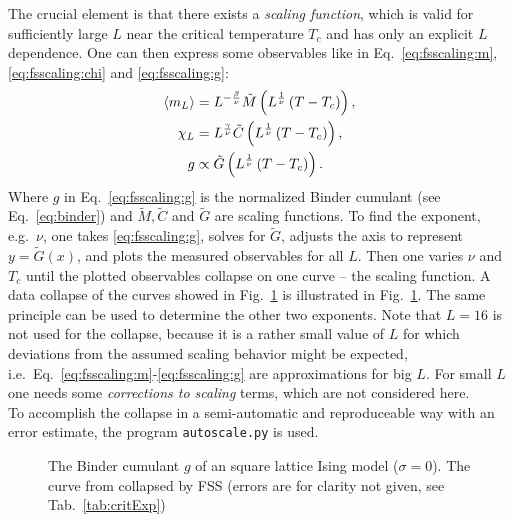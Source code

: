     The crucial element is that there exists a \emph{scaling function},
    which is valid for sufficiently large \(L\) near the critical
    temperature \(T_{c}\) and has only an explicit \(L\) dependence.
    One can then express some observables like in Eq.\ \eqref{eq:fsscaling:m}, \eqref{eq:fsscaling:chi} and
    \eqref{eq:fsscaling:g}:
    \begin{align}
        \label{eq:fsscaling:m}
        \left< m_L \right> &= L^{-\frac{\beta}{\nu}} \tilde{M}\left(L^\frac{1}{\nu}\left(T-T_c\right)\right),\\
        \label{eq:fsscaling:chi}
        \chi_L    &= L^{\frac{\gamma}{\nu}} \tilde{C}\left(L^\frac{1}{\nu}\left(T-T_c\right)\right),\\
        \label{eq:fsscaling:g}
        g         &\propto \tilde{G}\left(L^\frac{1}{\nu}\left(T-T_c\right)\right).
    \end{align}
    Where \(g\) in Eq.\ \eqref{eq:fsscaling:g} is the normalized
    Binder cumulant (see Eq.\ \eqref{eq:binder}) and \(\tilde{M}, \tilde{C}\) and \(\tilde{G}\)
    are scaling functions.
    To find the exponent, e.g.\ \(\nu\), one takes \eqref{eq:fsscaling:g},
    solves for \(\tilde{G}\), adjusts the axis to represent \(y=\tilde{G}(x)\),
    and plots the measured observables for all \(L\).
    Then one varies \(\nu\) and \(T_{c}\) until the plotted observables
    collapse on one curve -- the scaling function.
    A data collapse of the curves showed in Fig.\ \ref{fig:gettingCrit}
    is illustrated in Fig.\ \ref{fig:gettingCrit}.
    The same principle can be used to determine the other two exponents.
    Note that \(L=16\) is not used for the collapse, because it is a
    rather small value of \(L\) for which deviations from the assumed
    scaling behavior might be expected, i.e.\ Eq.\ \eqref{eq:fsscaling:m}-\eqref{eq:fsscaling:g}
    are approximations for big \(L\). For small \(L\) one needs some
    \emph{corrections to scaling} terms, which are not considered here.\\
    To accomplish the collapse in a semi-automatic and reproduceable
    way with an error estimate, the program
    \texttt{autoscale.py} \cite{autoscale2009} is used.
    \begin{figure}[htbp]
        \centering
        \caption[Examples of Determining Critical Temperature and Exponents]
        {
             The Binder cumulant \(g\)
                of an square lattice Ising model (\(\sigma=0\)).
             The curve from 
                collapsed by FSS (errors are for clarity
                not given, see Tab.\ \ref{tab:critExp})
        }
        \label{fig:gettingCrit}
    \end{figure}\\
